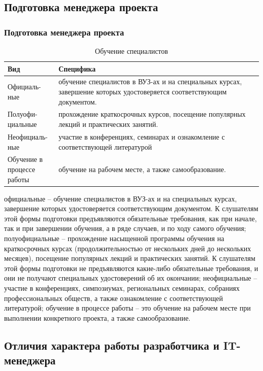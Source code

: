 \documentclass{../industrial-development}
\begin{document}
\subsection{Подготовка менеджера проекта}
\begin{frame} \frametitle{Подготовка менеджера проекта}

	 	\begin{table}[H]
\caption{\label{tab:canonsummary} Обучение специалистов}
\begin{center}
\begin{tabular}{|p{0.2\linewidth}|p{0.8\linewidth}|}
\hline
\textbf{Вид} & \textbf{Специфика} \\
\hline
Официаль-ные &  обучение специалистов в ВУЗ-ах и на специальных курсах, завершение которых удостоверяется соответствующим документом. \\
\hline
Полуофи-циальные  & прохождение краткосрочных курсов, посещение популярных лекций и практических занятий. \\
\hline
Неофициаль-ные &  участие в конференциях, семинарах и ознакомление с соответствующей литературой \\
\hline
Обучение в процессе работы & обучение на рабочем месте, а также самообразование. \\
\hline
\end{tabular}
\end{center}
\end{table} 
\end{frame}
\lecturenotes
официальные – обучение специалистов в ВУЗ-ах и на специальных курсах, завершение которых удостоверяется соответствующим документом. К слушателям этой формы подготовки предъявляются обязательные требования, как при начале, так и при завершении обучения, а в ряде случаев, и по ходу самого обучения;
полуофициальные – прохождение насыщенной программы обучения на краткосрочных курсах (продолжительностью от нескольких дней до нескольких месяцев), посещение популярных лекций и практических занятий. К слушателям этой формы подготовки не предъявляются какие-либо обязательные требования, и они не получают специальных удостоверений об их окончании;
неофициальные – участие в конференциях, симпозиумах, региональных семинарах, собраниях профессиональных обществ, а также ознакомление с соответствующей литературой;
обучение в процессе работы – это обучение на рабочем месте при выполнении конкретного проекта, а также самообразование.

\subsection{Отличия характера работы разработчика и IT-менеджера}
\end{document}
